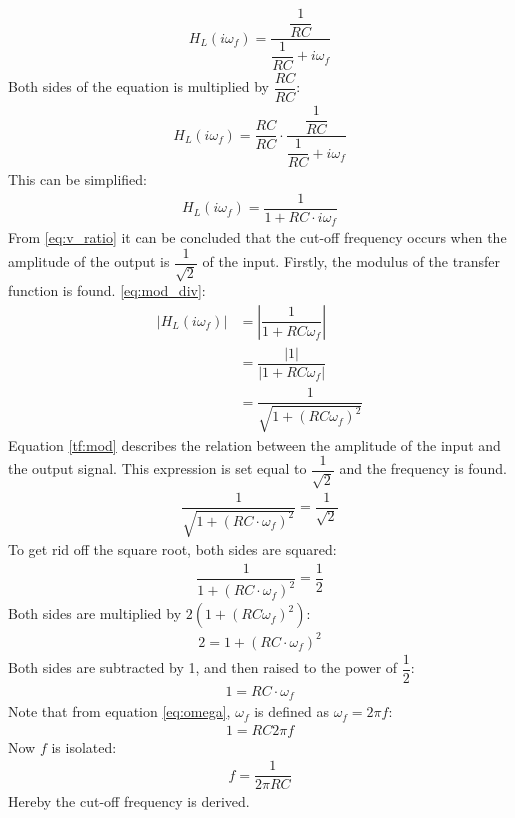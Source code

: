 \begin{align} \label{eq:trans_low}
H_{L}(i \omega_f) = \dfrac{\dfrac{1}{RC}}{\dfrac{1}{RC}+i \omega_f} 
\end{align}
Both sides of the equation is multiplied by $\dfrac{RC}{RC}$:
\begin{align}
H_{L}(i \omega_f) = \dfrac{RC}{RC} \cdot \dfrac{\dfrac{1}{RC}}{\dfrac{1}{RC}+i \omega_f} 
\end{align}
This can be simplified:
\begin{align}
H_{L}(i \omega_f) =  \dfrac{1}{1+RC \cdot i \omega_f} 
\end{align}
From \eqref{eq:v_ratio} it can be concluded that the cut-off frequency occurs when the amplitude of the output is $\dfrac{1}{\sqrt{2}}$ of the input. Firstly, the modulus of the transfer function is found.
\eqref{eq:mod_div}:
\begin{align}
\left|H_{L}(i \omega_f) \right| &=  \left|\dfrac{1}{1+RC \omega_f} \right| 
\\
&=\dfrac{|1|}{|1+RC\omega_f |}
\\
&=  \dfrac{1}{\sqrt{1+(RC \omega_f)^2}} \label{tf:mod}
\end{align}
Equation \eqref{tf:mod} describes the relation between the amplitude of the input and the output signal. This expression is set equal to $\dfrac{1}{\sqrt{2}}$ and the frequency is found.
\\
\begin{align*}
\dfrac{1}{\sqrt{1+ \left(RC \cdot \omega_f \right)^2}} = \dfrac{1}{\sqrt{2}}
\end{align*}
To get rid off the square root, both sides are squared:
\begin{align*}
\dfrac{1}{1+ \left(RC \cdot \omega_f \right)^2} = \dfrac{1}{2}
\end{align*}
	Both sides are multiplied by $2(1+(RC\omega_f)^2)$:
\begin{align*}
2 = 1+ \left(RC \cdot \omega_f \right)^2
\end{align*}
Both sides are subtracted by 1, and then raised to the power of $\dfrac{1}{2}$:
\begin{align*}
1 = RC \cdot \omega_f 
\end{align*}
Note that from equation \eqref{eq:omega}, $\omega_f$ is defined as $\omega_f=2 \pi f$:
\begin{align*}
1 = RC 2\pi f 
\end{align*}
Now $f$ is isolated:
\begin{align*}
f=\dfrac{1}{2\pi RC}
\end{align*}
Hereby the cut-off frequency is derived.

